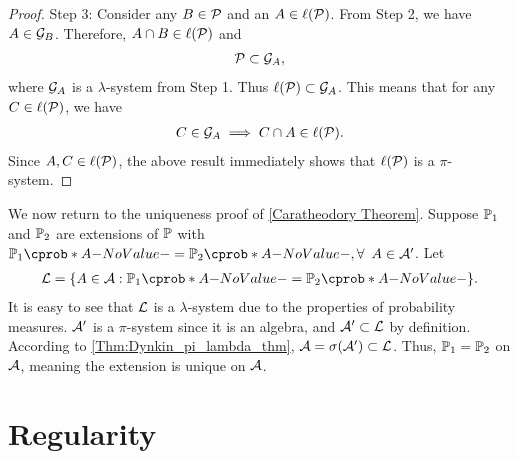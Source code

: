 \documentclass[12pt]{article}
\begin{document}
\begin{proof}
Step 3: Consider any $B \in \mathcal{P}$ and an $A \in \ell(\mathcal{P})$. From Step 2, we have $A \in \mathcal{G}_B$. Therefore, $A \cap B \in \ell(\mathcal{P})$ and 
\begin{align*}
\mathcal{P} \subset \mathcal{G}_A,
\end{align*}
where $\mathcal{G}_A$ is a $\lambda$-system from Step 1. Thus $\ell(\mathcal{P}) \subset \mathcal{G}_A$. This means that for any $C \in \ell(\mathcal{P})$, we have
\begin{align*}
C \in \mathcal{G}_A \implies C \cap A \in \ell(\mathcal{P}).
\end{align*}
Since $A, C \in \ell(\mathcal{P})$, the above result immediately shows that $\ell(\mathcal{P})$ is a $\pi$-system.
\end{proof}

We now return to the uniqueness proof of \cref{Caratheodory Theorem}. Suppose $\P_1$ and $\P_2$ are extensions of $\P$ with $\P_1(A) = \P_2(A), \forall\ A \in \calA'$. Let
\begin{align*}
\calL = \{A \in \calA: \P_1(A) = \P_2(A) \}.
\end{align*}
It is easy to see that $\mathcal{L}$ is a $\lambda$-system due to the properties of probability measures. $\mathcal{A}'$ is a $\pi$-system since it is an algebra, and $\mathcal{A}' \subset \mathcal{L}$ by definition. According to \cref{Thm:Dynkin_pi_lambda_thm}, $\mathcal{A} = \sigma(\mathcal{A}') \subset \mathcal{L}$. Thus, $\P_1 = \P_2$ on $\mathcal{A}$, meaning the extension is unique on $\mathcal{A}$.

\section{Regularity}
\end{document}
